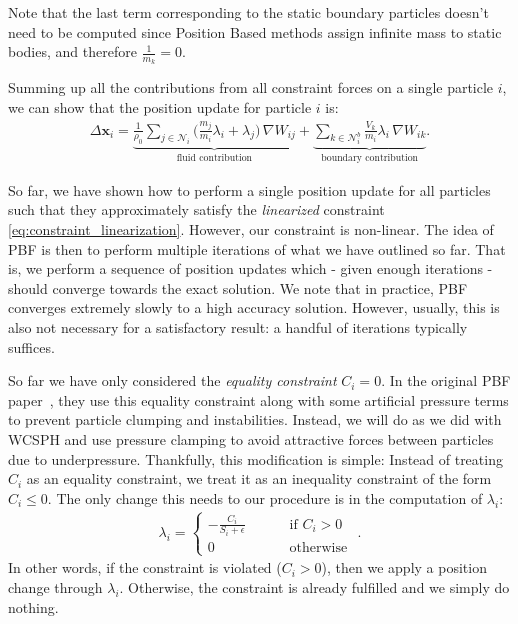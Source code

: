 \documentclass[11pt,a4paper,onesided]{vci_anim_exercise}
\renewcommand{\vec}[1]{\boldsymbol{\mathbf{#1}}}
\begin{document}
Note that the last term corresponding to the static boundary particles doesn't need to be computed since Position Based methods assign infinite mass to static bodies, and therefore $\frac{1}{m_k} = 0$.

Summing up all the contributions from all constraint forces on a single particle $i$, we can show that the position update for particle $i$ is:
\begin{align}
\Delta \vec x_i = \underbrace{\frac{1}{\rho_0} \sum_{j \in \mathcal{N}_i} \bigg( \frac{m_j}{m_i} \lambda_i + \lambda_j \bigg) \, \nabla W_{ij}
}_\text{fluid contribution}
+ \underbrace{\sum_{k \in \mathcal{N}^b_i} \frac{V_k}{m_i} \lambda_i \, \nabla W_{ik}}_\text{boundary contribution}.
\label{eq:delta_x}
\end{align}

So far, we have shown how to perform a single position update for all particles such that they approximately satisfy the \emph{linearized} constraint \eqref{eq:constraint_linearization}. However, our constraint is non-linear. The idea of PBF is then to perform multiple iterations of what we have outlined so far. That is, we perform a sequence of position updates which - given enough iterations - should converge towards the exact solution. We note that in practice, PBF converges extremely slowly to a high accuracy solution. However, usually, this is also not necessary for a satisfactory result: a handful of iterations typically suffices.

So far we have only considered the \emph{equality constraint} $C_i = 0$. In the original PBF paper~\cite{mm13}, they use this equality constraint along with some artificial pressure terms to prevent particle clumping and instabilities. Instead, we will do as we did with WCSPH and use pressure clamping to avoid attractive forces between particles due to underpressure. Thankfully, this modification is simple: Instead of treating $C_i$ as an equality constraint, we treat it as an inequality constraint of the form $C_i \leq 0$. The only change this needs to our procedure is in the computation of $\lambda_i$:
\begin{align}
\lambda_i = \begin{cases}
- \frac{C_i}{S_i + \epsilon} \qquad & \text{ if } C_i > 0 \\
0 \qquad & \text{ otherwise }
\end{cases}.
\label{eq:lambda}
\end{align}
In other words, if the constraint is violated ($C_i > 0$), then we apply a position change through $\lambda_i$. Otherwise, the constraint is already fulfilled and we simply do nothing.
\end{document}
